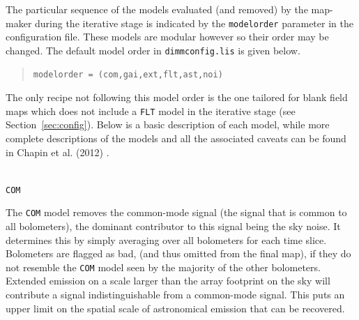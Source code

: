 \documentclass[twoside,11pt]{article}
\renewcommand{\_}{\texttt{\symbol{95}}}
\newenvironment{myquote}{\begin{quote}\begin{small}}{\end{small}\end{quote}}
\begin{document}
The particular sequence of the models evaluated (and removed) by the
map-maker during the iterative stage is indicated by the
\texttt{modelorder} parameter in the configuration file. These models
are modular however so their order may be changed. The default model
order in \texttt{dimmconfig.lis} is given below.
\vspace{-0.1cm}
\begin{myquote}
\begin{verbatim}
modelorder = (com,gai,ext,flt,ast,noi)
\end{verbatim}
\end{myquote}
\vspace{-0.1cm}
The only recipe not following this model order is the one tailored for
blank field maps which does not include a \texttt{FLT} model in the
iterative stage (see Section~\ref{sec:config}). Below is a basic
description of each model, while more complete descriptions of the
models and all the associated caveats can be found in Chapin et al.
(2012) \cite{mapmaker}.
\\ \\
\begin{minipage}[t]{0.07\linewidth}
\texttt{COM}
\end{minipage}
\begin{minipage}[t]{0.92\linewidth}The \texttt{COM} model removes the
common-mode signal (the signal that is common to all bolometers), the
dominant contributor to this signal being the sky noise. It determines
this by simply averaging over all bolometers for each time slice.
Bolometers are flagged as bad, (and thus omitted from the final map), if
they do not resemble the \texttt{COM} model seen by the majority of the
other bolometers.
\newline Extended emission on a scale larger than the array footprint
on the sky will contribute a signal indistinguishable from a
common-mode signal. This puts an upper limit on the spatial scale of
astronomical emission that can be recovered. \\
\end{minipage}
\end{document}
